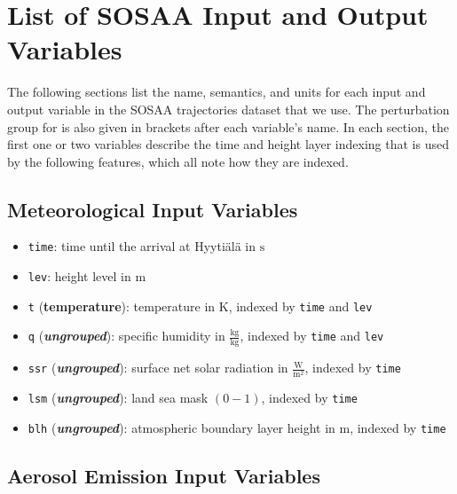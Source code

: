 \chapter{List of SOSAA Input and Output Variables} \label{app:sosaa-variables}

The following sections list the name, semantics, and units for each input and output variable in the SOSAA trajectories dataset that we use. The perturbation group for  is also given in brackets after each variable's name. In each section, the first one or two variables describe the time and height layer indexing that is used by the following features, which all note how they are indexed.

\section{Meteorological Input Variables}

\begin{itemize}
    \item \texttt{time}: time until the arrival at Hyyti\"al\"a in $\text{s}$
    \item \texttt{lev}: height level in $\text{m}$
    \item \texttt{t} (\textbf{temperature}): temperature in $\text{K}$, indexed by \texttt{time} and \texttt{lev}
    \item \texttt{q} (\textit{\textbf{ungrouped}}): specific humidity in $\frac{\text{kg}}{\text{kg}}$, indexed by \texttt{time} and \texttt{lev}
    \item \texttt{ssr} (\textit{\textbf{ungrouped}}): surface net solar radiation in $\frac{\text{W}}{\text{m}^2}$, indexed by \texttt{time}
    \item \texttt{lsm} (\textit{\textbf{ungrouped}}): land sea mask $(0-1)$, indexed by \texttt{time}
    \item \texttt{blh} (\textit{\textbf{ungrouped}}): atmospheric boundary layer height in $\text{m}$, indexed by \texttt{time}
\end{itemize}

\section{Aerosol Emission Input Variables}

